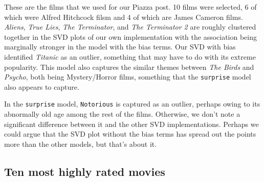These are the films that we used for our Piazza post. 10 films were selected, 6 of which were Alfred Hitchcock filsm and 
4 of which are James Cameron films. \textit{Aliens}, \textit{True Lies}, \textit{The Terminator}, and \textit{The Terminator 2} are roughly clustered together in 
the SVD plots of our own implementation with the association being marginally stronger in the model with the bias terms. Our SVD with bias 
identified \textit{Titanic} as an outlier, something that may have to do with its extreme popularity. This model also captures the similar 
themes between \textit{The Birds} and \textit{Psycho}, both being Mystery/Horror films, something that the \texttt{surprise} model also appears 
to capture.
\par 
In the \texttt{surprise} model, \texttt{Notorious} is captured as an outlier, perhaps owing to its abnormally old age among the rest of the films. 
Otherwise, we don't note a significant difference between it and the other SVD implementations. Perhaps we could argue that the SVD plot without 
the bias terms has spread out the points more than the other models, but that's about it. 

\subsection{Ten most highly rated movies}

